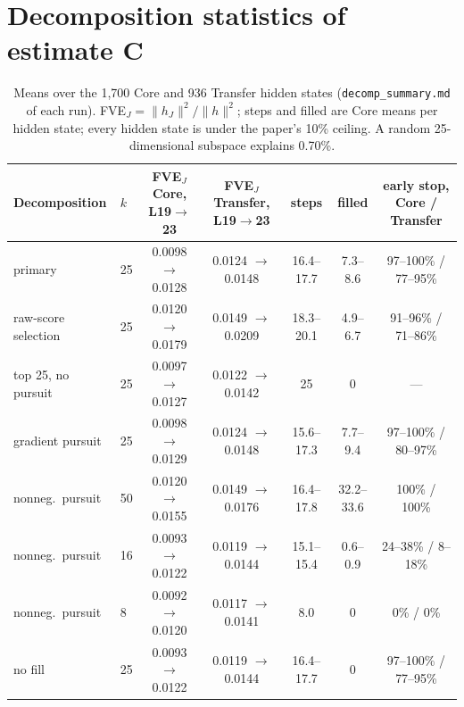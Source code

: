 \documentclass[11pt,a4paper]{article}
\newcommand{\hJ}{h_J}
\newcommand{\norm}[1]{\lVert #1 \rVert}
\begin{document}
\section{Decomposition statistics of estimate C}
\label{app:decomp}

\begin{table}[H]
\centering\scriptsize\setlength{\tabcolsep}{2.5pt}
\begin{tabular}{@{}llccccc@{}}
\toprule
Decomposition & $k$ & FVE$_J$ Core, L19$\to$23 & FVE$_J$ Transfer, L19$\to$23 & steps & filled & early stop, Core / Transfer \\
\midrule
primary & 25 & 0.0098 $\to$ 0.0128 & 0.0124 $\to$ 0.0148 & 16.4--17.7 & 7.3--8.6 & 97--100\% / 77--95\% \\
raw-score selection & 25 & 0.0120 $\to$ 0.0179 & 0.0149 $\to$ 0.0209 & 18.3--20.1 & 4.9--6.7 & 91--96\% / 71--86\% \\
top 25, no pursuit & 25 & 0.0097 $\to$ 0.0127 & 0.0122 $\to$ 0.0142 & 25 & 0 & --- \\
gradient pursuit & 25 & 0.0098 $\to$ 0.0129 & 0.0124 $\to$ 0.0148 & 15.6--17.3 & 7.7--9.4 & 97--100\% / 80--97\% \\
nonneg.\ pursuit & 50 & 0.0120 $\to$ 0.0155 & 0.0149 $\to$ 0.0176 & 16.4--17.8 & 32.2--33.6 & 100\% / 100\% \\
nonneg.\ pursuit & 16 & 0.0093 $\to$ 0.0122 & 0.0119 $\to$ 0.0144 & 15.1--15.4 & 0.6--0.9 & 24--38\% / 8--18\% \\
nonneg.\ pursuit & 8 & 0.0092 $\to$ 0.0120 & 0.0117 $\to$ 0.0141 & 8.0 & 0 & 0\% / 0\% \\
no fill & 25 & 0.0093 $\to$ 0.0122 & 0.0119 $\to$ 0.0144 & 16.4--17.7 & 0 & 97--100\% / 77--95\% \\
\bottomrule
\end{tabular}
\caption{Means over the 1,700 Core and 936 Transfer hidden states (\texttt{decomp\_summary.md} of each run). FVE$_J=\norm{\hJ}^2/\norm{h}^2$; steps and filled are Core means per hidden state; every hidden state is under the paper's 10\% ceiling. A random 25-dimensional subspace explains 0.70\%.}
\end{table}
\end{document}
